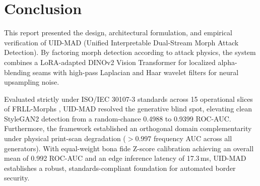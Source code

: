 \documentclass[11pt,a4paper]{article}
\begin{document}
\section{Conclusion}
\label{sec:conclusion}

This report presented the design, architectural formulation, and empirical verification of UID-MAD (Unified Interpretable Dual-Stream Morph Attack Detection). By factoring morph detection according to attack physics, the system combines a LoRA-adapted DINOv2 Vision Transformer for localized alpha-blending seams with high-pass Laplacian and Haar wavelet filters for neural upsampling noise. 

Evaluated strictly under ISO/IEC 30107-3 \cite{iso30107_3} standards across 15 operational slices of FRLL-Morphs \cite{debruine2017face}, UID-MAD resolved the generative blind spot, elevating clean StyleGAN2 detection from a random-chance 0.4988 to 0.9399 ROC-AUC. Furthermore, the framework established an orthogonal domain complementarity under physical print-scan degradation ($>0.997$ frequency AUC across all generators). With equal-weight bona fide Z-score calibration achieving an overall mean of 0.992 ROC-AUC and an edge inference latency of 17.3\,ms, UID-MAD establishes a robust, standards-compliant foundation for automated border security.

\vspace{10pt}
\end{document}

